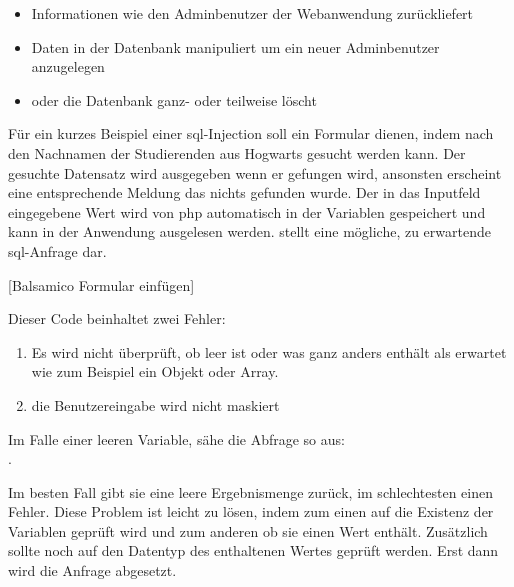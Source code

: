 \begin{itemize}
	\item Informationen wie den Adminbenutzer der Webanwendung zurückliefert
	\item Daten in der Datenbank manipuliert um ein neuer Adminbenutzer anzugelegen
	\item oder die Datenbank ganz- oder teilweise löscht
\end{itemize}

Für ein kurzes Beispiel einer \gls{sql}-Injection soll ein Formular dienen, indem nach den Nachnamen der Studierenden aus Hogwarts gesucht werden kann. Der gesuchte  Datensatz wird ausgegeben wenn er gefungen wird, ansonsten erscheint eine entsprechende Meldung das nichts gefunden wurde. Der in das Inputfeld eingegebene Wert wird von \gls{php} automatisch in der Variablen  gespeichert und kann in der Anwendung ausgelesen werden.  stellt eine mögliche, zu erwartende \gls{sql}-Anfrage dar.

[Balsamico Formular einfügen]

\begin{listing}[H]
\caption{}
\label{lst:sqlInjections}
\end{listing}

Dieser Code beinhaltet zwei Fehler:

\begin{enumerate}
	\item Es wird nicht überprüft, ob  leer ist oder was ganz anders enthält als erwartet wie zum Beispiel ein Objekt oder Array.
	\item die Benutzereingabe wird nicht maskiert
\end{enumerate}

Im Falle einer leeren Variable, sähe die Abfrage so aus:\\ .

Im besten Fall gibt sie eine leere Ergebnismenge zurück, im schlechtesten einen Fehler. Diese Problem ist leicht zu lösen, indem zum einen auf die Existenz der Variablen geprüft wird und zum anderen ob sie einen Wert enthält. Zusätzlich sollte noch auf den Datentyp des enthaltenen Wertes geprüft werden. Erst dann wird die Anfrage abgesetzt.

